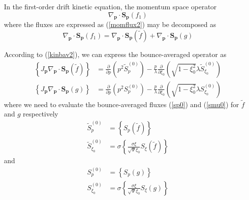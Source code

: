 
\label{dkefluxconsmomentum}In the first-order drift kinetic
equation, the momentum space operator
\begin{equation}
\nabla_{\mathbf{p}}\cdot\mathbf{S}_{\mathbf{p}}\left(  f_{1}\right)
\label{momentumdke}%
\end{equation}
where the fluxes are expressed as (\ref{momflux2}) may be decomposed as
\begin{equation}
\nabla_{\mathbf{p}}\cdot\mathbf{S}_{\mathbf{p}}\left(  f_{1}\right)
=\nabla_{\mathbf{p}}\cdot\mathbf{S}_{\mathbf{p}}\left(  \widetilde{f}\right)
+\nabla_{\mathbf{p}}\cdot\mathbf{S}_{\mathbf{p}}\left(  g\right)
\end{equation}

According to (\ref{kinbav2}), we can express the bounce-averaged operator as
\begin{align}
\left\{  J_{\mathbf{p}}\nabla_{\mathbf{p}}\cdot\mathbf{S}_{\mathbf{p}}\left(
\widetilde{f}\right)  \right\}   &  =\frac{\partial}{\partial p}\left(
p^{2}\widetilde{S}_{p}^{\left(  0\right)  }\right)  -\frac{p}{\lambda}%
\frac{\partial}{\partial\xi_{0}}\left(  \sqrt{1-\xi_{0}^{2}}\lambda
\widetilde{S}_{\xi_{0}}^{\left(  0\right)  }\right) \\
\left\{  J_{\mathbf{p}}\nabla_{\mathbf{p}}\cdot\mathbf{S}_{\mathbf{p} }\left(
g\right)  \right\}   &  =\frac{\partial}{\partial p}\left(  p^{2}%
S_{p}^{\left(  0\right)  }\right)  -\frac{p}{\lambda}\frac{\partial}%
{\partial\xi_{0}}\left(  \sqrt{1-\xi_{0}^{2}}\lambda S_{\xi_{0}}^{\left(
0\right)  }\right) \label{kinbav3}%
\end{align}
where we need to evaluate the bounce-averaged fluxes (\ref{sp0}) and
(\ref{smu0}) for $\widetilde{f}$ and $g$ respectively
\begin{align}
\widetilde{S}_{p}^{\left(  0\right)  } &  =\left\{  S_{p}\left(  \widetilde
{f}\right)  \right\} \\
\widetilde{S}_{\xi_{0}}^{\left(  0\right)  } &  =\sigma\left\{  \frac
{\sigma\xi}{\sqrt{\Psi}\xi_{0}}S_{\xi}\left(  \widetilde{f}\right)  \right\}
\end{align}
and
\begin{align}
S_{p}^{\left(  0\right)  } &  =\left\{  S_{p}\left(  g\right)  \right\} \\
S_{\xi_{0}}^{\left(  0\right)  } &  =\sigma\left\{  \frac{\sigma\xi}%
{\sqrt{\Psi}\xi_{0}}S_{\xi}\left(  g\right)  \right\}
\end{align}

